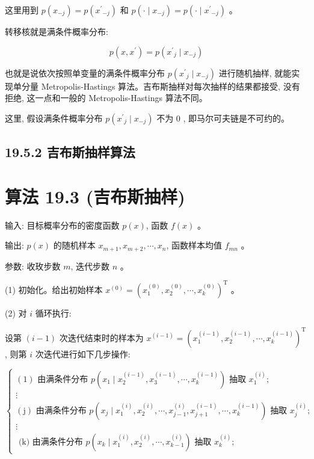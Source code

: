 \documentclass[10pt]{article}
\begin{document}
\begin{CJK*}{UTF8}{bsmi}
这里用到 $p\left(x_{-j}\right)=p\left(x^{\prime}{ }_{-j}\right)$ 和 $p\left(\cdot \mid x_{-j}\right)=p\left(\cdot \mid x^{\prime}{ }_{-j}\right)$ 。

转移核就是满条件概率分布:


\begin{equation*}
p\left(x, x^{\prime}\right)=p\left(x^{\prime}{ }_{j} \mid x_{-j}\right) \tag{19.51}
\end{equation*}


也就是说依次按照单变量的满条件概率分布 $p\left(x^{\prime}{ }_{j} \mid x_{-j}\right)$ 进行随机抽样, 就能实现单分量 Metropolis-Hastings 算法。吉布斯抽样对每次抽样的结果都接受, 没有拒绝, 这一点和一般的 Metropolis-Hastings 算法不同。

这里, 假设满条件概率分布 $p\left(x^{\prime}{ }_{j} \mid x_{-j}\right)$ 不为 0 , 即马尔可夫链是不可约的。

\subsection*{19.5.2 吉布斯抽样算法}
\section*{算法 19.3 (吉布斯抽样)}
输入: 目标概率分布的密度函数 $p(x)$, 函数 $f(x)$ 。

输出: $p(x)$ 的随机样本 $x_{m+1}, x_{m+2}, \cdots, x_{n}$, 函数样本均值 $f_{m n}$ 。

参数: 收玫步数 $m$, 迭代步数 $n$ 。

(1) 初始化。给出初始样本 $x^{(0)}=\left(x_{1}^{(0)}, x_{2}^{(0)}, \cdots, x_{k}^{(0)}\right)^{\mathrm{T}}$ 。

(2) 对 $i$ 循环执行:

设第 $(i-1)$ 次迭代结束时的样本为 $x^{(i-1)}=\left(x_{1}^{(i-1)}, x_{2}^{(i-1)}, \cdots, x_{k}^{(i-1)}\right)^{\mathrm{T}}$, 则第 $i$ 次迭代进行如下几步操作:

$\left\{\begin{array}{l}(1) \text { 由满条件分布 } p\left(x_{1} \mid x_{2}^{(i-1)}, x_{3}^{(i-1)}, \cdots, x_{k}^{(i-1)}\right) \text { 抽取 } x_{1}^{(i)} \text {; } \\ \vdots \\ (\mathrm{j}) \text { 由满条件分布 } p\left(x_{j} \mid x_{1}^{(i)}, x_{2}^{(i)}, \cdots, x_{j-1}^{(i)}, x_{j+1}^{(i-1)}, \cdots, x_{k}^{(i-1)}\right) \text { 抽取 } x_{j}^{(i)} \text {; } \\ \vdots \\ \text { (k) 由满条件分布 } p\left(x_{k} \mid x_{1}^{(i)}, x_{2}^{(i)}, \cdots, x_{k-1}^{(i)}\right) \text { 抽取 } x_{k}^{(i)} ;\end{array}\right.$


\end{CJK*}
\end{document}
